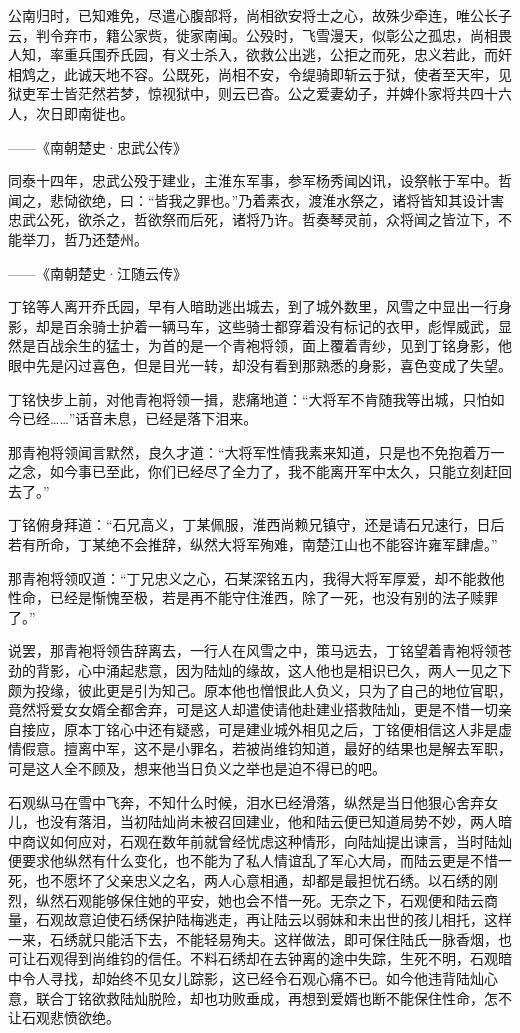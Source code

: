 公南归时，已知难免，尽遣心腹部将，尚相欲安将士之心，故殊少牵连，唯公长子云，判令弃市，籍公家赀，徙家南闽。公殁时，飞雪漫天，似彰公之孤忠，尚相畏人知，率重兵围乔氏园，有义士杀入，欲救公出逃，公拒之而死，忠义若此，而奸相鸩之，此诚天地不容。公既死，尚相不安，令缇骑即斩云于狱，使者至天牢，见狱吏军士皆茫然若梦，惊视狱中，则云已杳。公之爱妻幼子，并婢仆家将共四十六人，次日即南徙也。

——《南朝楚史·忠武公传》

同泰十四年，忠武公殁于建业，主淮东军事，参军杨秀闻凶讯，设祭帐于军中。哲闻之，悲恸欲绝，曰：“皆我之罪也。”乃着素衣，渡淮水祭之，诸将皆知其设计害忠武公死，欲杀之，哲欲祭而后死，诸将乃许。哲奏琴灵前，众将闻之皆泣下，不能举刀，哲乃还楚州。

——《南朝楚史·江随云传》

丁铭等人离开乔氏园，早有人暗助逃出城去，到了城外数里，风雪之中显出一行身影，却是百余骑士护着一辆马车，这些骑士都穿着没有标记的衣甲，彪悍威武，显然是百战余生的猛士，为首的是一个青袍将领，面上覆着青纱，见到丁铭身影，他眼中先是闪过喜色，但是目光一转，却没有看到那熟悉的身影，喜色变成了失望。

丁铭快步上前，对他青袍将领一揖，悲痛地道：“大将军不肯随我等出城，只怕如今已经……”话音未息，已经是落下泪来。

那青袍将领闻言默然，良久才道：“大将军性情我素来知道，只是也不免抱着万一之念，如今事已至此，你们已经尽了全力了，我不能离开军中太久，只能立刻赶回去了。”

丁铭俯身拜道：“石兄高义，丁某佩服，淮西尚赖兄镇守，还是请石兄速行，日后若有所命，丁某绝不会推辞，纵然大将军殉难，南楚江山也不能容许雍军肆虐。”

那青袍将领叹道：“丁兄忠义之心，石某深铭五内，我得大将军厚爱，却不能救他性命，已经是惭愧至极，若是再不能守住淮西，除了一死，也没有别的法子赎罪了。”

说罢，那青袍将领告辞离去，一行人在风雪之中，策马远去，丁铭望着青袍将领苍劲的背影，心中涌起悲意，因为陆灿的缘故，这人他也是相识已久，两人一见之下颇为投缘，彼此更是引为知己。原本他也憎恨此人负义，只为了自己的地位官职，竟然将爱女女婿全都舍弃，可是这人却遣使请他赴建业搭救陆灿，更是不惜一切亲自接应，原本丁铭心中还有疑惑，可是建业城外相见之后，丁铭便相信这人非是虚情假意。擅离中军，这不是小罪名，若被尚维钧知道，最好的结果也是解去军职，可是这人全不顾及，想来他当日负义之举也是迫不得已的吧。

石观纵马在雪中飞奔，不知什么时候，泪水已经滑落，纵然是当日他狠心舍弃女儿，也没有落泪，当初陆灿尚未被召回建业，他和陆云便已知道局势不妙，两人暗中商议如何应对，石观在数年前就曾经忧虑这种情形，向陆灿提出谏言，当时陆灿便要求他纵然有什么变化，也不能为了私人情谊乱了军心大局，而陆云更是不惜一死，也不愿坏了父亲忠义之名，两人心意相通，却都是最担忧石绣。以石绣的刚烈，纵然石观能够保住她的平安，她也会不惜一死。无奈之下，石观便和陆云商量，石观故意迫使石绣保护陆梅逃走，再让陆云以弱妹和未出世的孩儿相托，这样一来，石绣就只能活下去，不能轻易殉夫。这样做法，即可保住陆氏一脉香烟，也可让石观得到尚维钧的信任。不料石绣却在去钟离的途中失踪，生死不明，石观暗中令人寻找，却始终不见女儿踪影，这已经令石观心痛不已。如今他违背陆灿心意，联合丁铭欲救陆灿脱险，却也功败垂成，再想到爱婿也断不能保住性命，怎不让石观悲愤欲绝。

